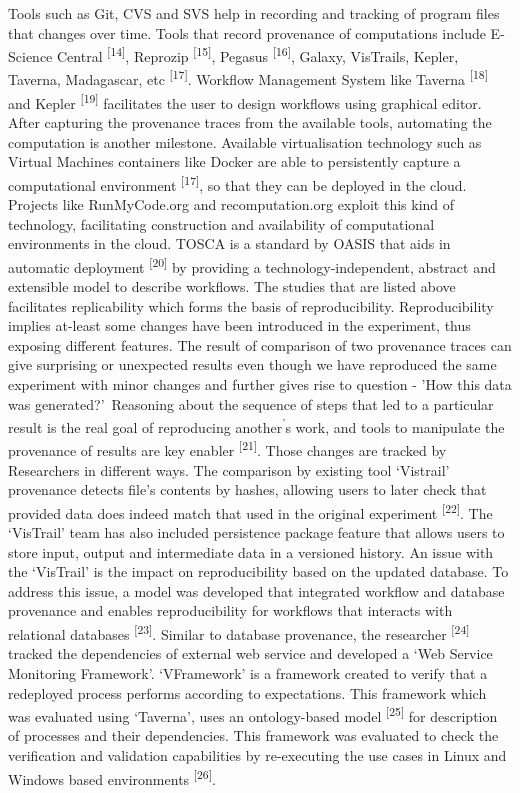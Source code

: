 \documentclass[6pt,,a4paper]{article}
\begin{document}
Tools such as Git, CVS and SVS help in recording and tracking of program files that changes over time. Tools that record provenance of computations include E-Science Central \textsuperscript{[14]}, Reprozip \textsuperscript{[15]}, Pegasus \textsuperscript{[16]}, Galaxy, VisTrails, Kepler, Taverna, Madagascar, etc \textsuperscript{[17]}. Workflow Management System like Taverna \textsuperscript{[18]} and Kepler \textsuperscript{[19]} facilitates the user to design workflows using graphical editor.  
After capturing the provenance traces from the available tools, automating the computation is another milestone. Available virtualisation technology such as Virtual Machines containers like Docker are able to persistently capture a computational environment \textsuperscript{[17]}, so that they can be deployed in the cloud. Projects like RunMyCode.org and recomputation.org exploit this kind of technology, facilitating construction and availability of computational environments in the cloud. TOSCA is a standard by OASIS that aids in automatic deployment \textsuperscript{[20]} by providing a technology-independent, abstract and extensible model to describe workflows.
The studies that are listed above facilitates replicability which forms the basis of reproducibility. Reproducibility implies at-least some changes have been introduced in the experiment, thus exposing different features. The result of comparison of two provenance traces can give surprising or unexpected results even though we have reproduced the same experiment with minor changes and further gives rise to question - 'How this data was generated?'\, Reasoning about the sequence of steps that led to a particular result is the real goal of reproducing another\textsuperscript{'}s work, and tools to manipulate the provenance of results are key enabler \textsuperscript{[21]}. Those changes are tracked by Researchers in different ways. The comparison by existing tool ‘Vistrail’ provenance detects file’s contents by hashes, allowing users to later check that provided data does indeed match that used in the original experiment \textsuperscript{[22]}. The ‘VisTrail’ team has also included persistence package feature that allows users to store input, output and intermediate data in a versioned history.  An issue with the ‘VisTrail’ is the impact on reproducibility based on the updated database. To address this issue, a model was developed that integrated workflow and database provenance and enables reproducibility for workflows that interacts with relational databases \textsuperscript{[23]}. Similar to database provenance, the researcher \textsuperscript{[24]} tracked the dependencies of external web service and developed a ‘Web Service Monitoring Framework’. ‘VFramework’ is a framework created to verify that a redeployed process performs according to expectations. This framework which was evaluated using ‘Taverna’, uses an ontology-based model \textsuperscript{[25]} for description of processes and their dependencies. This framework was evaluated to check the verification and validation capabilities by re-executing the use cases in Linux and Windows based environments \textsuperscript{[26]}.
\end{document}
